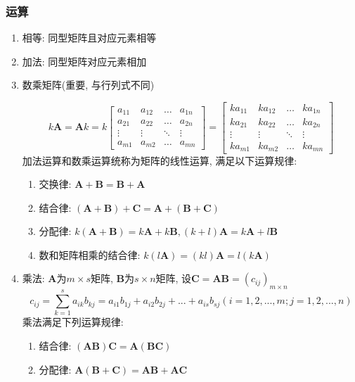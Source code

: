\subsubsection{运算}
\begin{enumerate}
\item 相等: 同型矩阵且对应元素相等
\item 加法: 同型矩阵对应元素相加
\item 数乘矩阵(重要, 与行列式不同)\par
\begin{equation*}
k\bm{A} = \bm{A}k = k
\begin{bmatrix}
a_{11}	& a_{12}  & \dots & a_{1n} \\
a_{21}	& a_{22} & \dots & a_{2n} \\
\vdots	& \vdots & \ddots & \vdots \\
a_{m1}	& a_{m2} & \dots & a_{mn}
\end{bmatrix} =
\begin{bmatrix}
ka_{11}	& ka_{12}  & \dots & ka_{1n} \\
ka_{21}	& ka_{22} & \dots & ka_{2n} \\
\vdots	& \vdots & \ddots & \vdots \\
ka_{m1}	& ka_{m2} & \dots & ka_{mn}
\end{bmatrix}
\end{equation*}
加法运算和数乘运算统称为矩阵的线性运算, 满足以下运算规律:
\begin{enumerate}
\item 交换律: $ \bm{A}+\bm{B}=\bm{B}+\bm{A} $
\item 结合律: $ (\bm{A}+\bm{B})+\bm{C}=\bm{A}+(\bm{B}+\bm{C}) $
\item 分配律: $ k(\bm{A}+\bm{B})=k\bm{A}+k\bm{B}, (k+l)\bm{A}=k\bm{A}+l\bm{B} $
\item 数和矩阵相乘的结合律: $ k(l\bm{A})=(kl)\bm{A}=l(k\bm{A}) $
\end{enumerate}
\item 乘法: $ \bm{A} $为$ m\times s $矩阵, $ \bm{B} $为$ s\times n $矩阵, 设$ \bm{C}=\bm{A}\bm{B}=(c_{ij})_{m\times n} $
\begin{equation*}
c_{ij}=\sum_{k=1}^{s}a_{ik}b_{kj}=a_{i1}b_{1j}+a_{i2}b_{2j}+...+a_{is}b_{sj}(i=1,2,...,m;j=1,2,...,n)
\end{equation*}
乘法满足下列运算规律:
\begin{enumerate}
\item 结合律: $ (\bm{A}\bm{B})\bm{C}=\bm{A}(\bm{B}\bm{C}) $
\item 分配律: $ \bm{A}(\bm{B}+\bm{C})=\bm{A}\bm{B}+\bm{A}\bm{C} $

\end{enumerate}
\end{enumerate}
